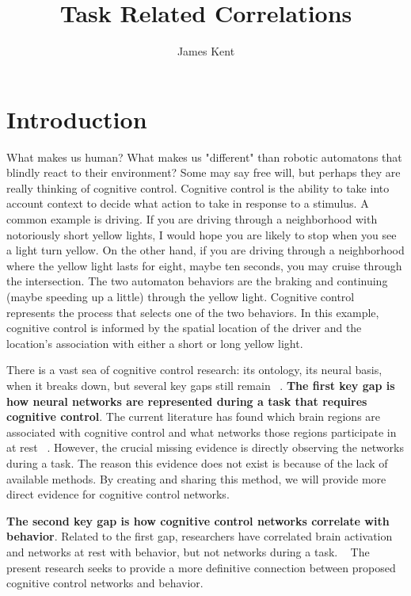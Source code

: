 \documentclass[phd,appendix,figures]{uithesis}
\title{Task Related Correlations}
\author{James Kent}
\begin{document}
\frontmatter

\chapter{Introduction}

What makes us human?
What makes us "different" than robotic automatons that blindly react to their environment?
Some may say free will, but perhaps they are really thinking of cognitive control.
Cognitive control is the ability to take into account context to decide what action to take in response to a stimulus. 
A common example is driving.
If you are driving through a neighborhood with notoriously short yellow lights, I would hope you are likely to stop when you see a light turn yellow.
On the other hand, if you are driving through a neighborhood where the yellow light lasts for eight, maybe ten seconds, you may cruise through the intersection.
The two automaton behaviors are the braking and continuing (maybe speeding up a little) through the yellow light.
Cognitive control represents the process that selects one of the two behaviors.
In this example, cognitive control is informed by the spatial location of the driver and the location's association with either a short or long yellow light.

There is a vast sea of cognitive control research: its ontology, its neural basis, when it breaks down, but several key gaps still remain ~\citep{Gratton2017,Dosenbach2010,Braver2000}.
\textbf{The first key gap is how neural networks are represented during a task that requires cognitive control}.
The current literature has found which brain regions are associated with cognitive control and what networks those regions participate in at rest ~\citep{Gratton2017a,Lerman-Sinkoff2017,Herd2006,Rizio2012,Cooper2015,AppelBaum2014,Dosenbach2007}.
However, the crucial missing evidence is directly observing the networks during a task.
The reason this evidence does not exist is because of the lack of available methods.
By creating and sharing this method, we will provide more direct evidence for cognitive control networks.

\textbf{The second key gap is how cognitive control networks correlate with behavior}.
Related to the first gap, researchers have correlated brain activation and networks at rest with behavior, but not networks during a task. ~\citep{nomura2010b,Egner2004,Gonthier2016a,Braver2010,Huang2017}
The present research seeks to provide a more definitive connection between proposed cognitive control networks and behavior.
\end{document}
